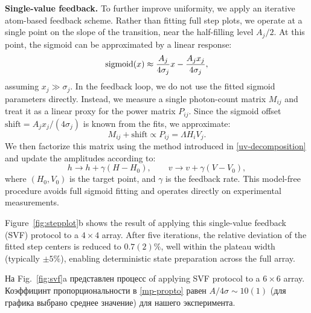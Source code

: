 \textbf{Single-value feedback.}
To further improve uniformity, we apply an iterative atom-based feedback scheme. Rather than fitting full step plots, we operate at a single point on the slope of the transition, near the half-filling level $A_j / 2$. At this point, the sigmoid can be approximated by a linear response:
\begin{equation*}
    \mathop{\mathrm{sigmoid}}\nolimits(x) \approx \frac{A_j}{4 \sigma_j} x - \frac{A_j x_j}{4 \sigma_j},
\end{equation*}
assuming $x_j \gg \sigma_j$.  In the feedback loop, we do not use the fitted sigmoid parameters directly. Instead, we measure a single photon-count matrix $M_{ij}$ and treat it as a linear proxy for the power matrix $P_{ij}$. Since the sigmoid offset $\mathrm{shift} = A_j x_j / (4 \sigma_j)$ is known from the fits, we approximate:
\begin{equation}
    \label{mp-propto}
    M_{ij} + \mathrm{shift} \propto P_{ij} = \Lambda H_i V_j.
\end{equation}
We then factorize this matrix using the method introduced in \eqref{uv-decomposition} and update the amplitudes according to:
\begin{equation*}
    h \rightarrow h + \gamma (H - H_0), \qquad
    v \rightarrow v + \gamma (V - V_0),
\end{equation*}
where $(H_0, V_0)$ is the target point, and $\gamma$ is the feedback rate. This model-free procedure avoids full sigmoid fitting and operates directly on experimental measurements.

Figure~\ref{fig:stepplot}b shows the result of applying this single-value feedback (SVF) protocol to a $4 \times 4$ array. After five iterations, the relative deviation of the fitted step centers is reduced to $0.7(2)\%$, well within the plateau width (typically $\pm5\%$), enabling deterministic state preparation across the full array. 

На Fig.~\ref{fig:svf}a представлен процесс of applying SVF protocol to a $6 \times 6$ array. Коэффицинт пропорциональности в \eqref{mp-propto} равен $A/4\sigma \sim 10(1)$ (для графика выбрано среднее значение) для нашего эксперимента.